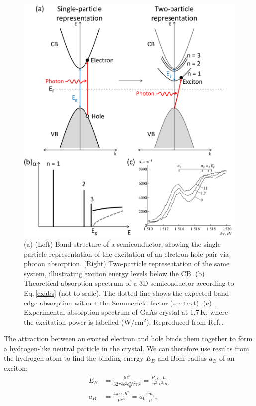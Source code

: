 \begin{figure}[h!] 
\centering    
\includegraphics[width=\textwidth]{Fig1}
\caption{(a) (Left) Band structure of a semiconductor, showing the single-particle representation of the excitation of an electron-hole pair via photon absorption. (Right) Two-particle representation of the same system, illustrating exciton energy levels below the CB. (b) Theoretical absorption spectrum of a 3D semiconductor according to Eq.\,\ref{exabs} (not to scale). The dotted line shows the expected band edge absorption without the Sommerfeld factor (see text). (c) Experimental absorption spectrum of GaAs crystal at 1.7\,K, where the excitation power is labelled (W/cm$^2$). Reproduced from Ref.\,\cite{Vaganov2013}.}
\label{2Fig1}
\end{figure}
The attraction between an excited electron and hole binds them together to form a hydrogen-like neutral particle in the crystal. We can therefore use results from the hydrogen atom to find the binding energy $E_B$ and Bohr radius $a_B$ of an exciton:
\begin{subequations}
\label{ex3D}
\begin{align}
E_B &=\frac{\mu e^4}{32\pi^2\epsilon^2\epsilon_0^2\hbar^2n^2} = \frac{R_H}{n^2}\frac{\mu}{\epsilon^2 m_e} \label{exbinding3D}\\
a_B &= \frac{4\pi\epsilon\epsilon_0\hbar^2}{\mu e^4}=a_0\frac{\epsilon m_e}{\mu} \label{exrad3D},
\end{align}
\end{subequations}
